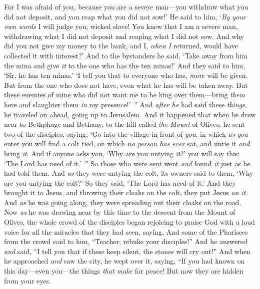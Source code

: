 \begin{biblechapter}
\verse For I was afraid of you, because you are a severe man—you withdraw what you did not deposit, and you reap what you did not sow!’
\verse He said to him, ‘\textit{By your own words} I will judge you, wicked slave! You knew that I am a severe man, withdrawing what I did not deposit and reaping what I did not sow.
\verse And why did you not give my money to the bank, and I, \textit{when I} returned, would have collected it with interest?’
\verse And to the bystanders he said, ‘Take away from him the mina and give \textit{it} to the one who has the ten minas!’
\verse And they said to him, ‘Sir, he has ten minas.’
\verse ‘I tell you that to everyone who has, \textit{more} will be given. But from the one who does not have, even what he has will be taken away.
\verse But these enemies of mine who did not want me to be king over them—bring \textit{them} here and slaughter them \textit{in} my presence!’ ”
 And \textit{after he} had said these \textit{things}, he traveled on ahead, going up to Jerusalem.
\verse And it happened that when he drew near to Bethphage and Bethany, to the hill called \textit{the Mount} of Olives, he sent two of the disciples,
\verse saying, ‘Go into the village in front of \textit{you}, in which \textit{as you} enter you will find a colt tied, on which \textit{no person has ever} sat, and untie it \textit{and} bring \textit{it}.
\verse And if anyone asks you, ‘Why are you untying \textit{it}?’ you will say this: ‘The Lord has need of it.’ ”
\verse So those who were sent went \textit{and} found \textit{it} just as he had told them.
\verse And \textit{as} they were untying the colt, its owners said to them, ‘Why are you untying the colt?’
\verse So they said, ‘The Lord has need of it.’
\verse And they brought it to Jesus, and throwing their cloaks on the colt, they put Jesus \textit{on it}.
\verse And \textit{as} he was going along, they were spreading out their cloaks on the road.
\verse Now \textit{as} he was drawing near by this time to the descent from the Mount of Olives, the whole crowd of the disciples began rejoicing to praise God with a loud voice for all the miracles that they had seen,
\verse saying,
\verse And some of the Pharisees from the crowd said to him, “Teacher, rebuke your disciples!”
\verse And he answered \textit{and} said, “I tell you that if these keep silent, the stones will cry out!”
 And when he approached \textit{and} saw the city, he wept over it,
\verse saying, “If you had known on this day—even you—the things \textit{that make} for peace! But now they are hidden from your eyes.

\end{biblechapter}
